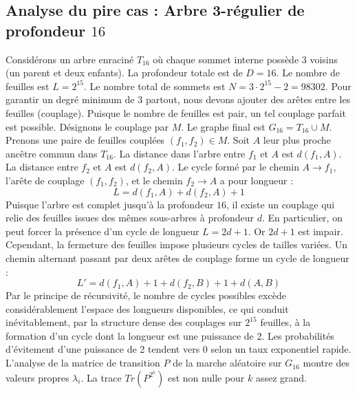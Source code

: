 \documentclass[11pt,a4paper]{article}
\begin{document}
\subsection{Analyse du pire cas : Arbre 3-régulier de profondeur $16$}
Considérons un arbre enraciné $T_16$ où chaque sommet interne possède 3 voisins (un parent et deux enfants).
La profondeur totale est de $D = 16$.
Le nombre de feuilles est $L = 2^{15}$.
Le nombre total de sommets est $N = 3 \cdot 2^{15} - 2 = 98302$.
Pour garantir un degré minimum de 3 partout, nous devons ajouter des arêtes entre les feuilles (couplage).
Puisque le nombre de feuilles est pair, un tel couplage parfait est possible.
Désignons le couplage par $M$. Le graphe final est $G_16 = T_16 \cup M$.
Prenons une paire de feuilles couplées $(f_1, f_2) \in M$.
Soit $A$ leur plus proche ancêtre commun dans $T_16$.
La distance dans l'arbre entre $f_1$ et $A$ est $d(f_1, A)$.
La distance entre $f_2$ et $A$ est $d(f_2, A)$.
Le cycle formé par le chemin $A \to f_1$, l'arête de couplage $(f_1, f_2)$, et le chemin $f_2 \to A$ a pour longueur :
$$ L = d(f_1, A) + d(f_2, A) + 1 $$
Puisque l'arbre est complet jusqu'à la profondeur $16$, il existe un couplage qui relie des feuilles issues des mêmes sous-arbres à profondeur $d$.
En particulier, on peut forcer la présence d'un cycle de longueur $L = 2d + 1$. Or $2d+1$ est impair.
Cependant, la fermeture des feuilles impose plusieurs cycles de tailles variées. Un chemin alternant passant par deux arêtes de couplage forme un cycle de longueur :
$$ L' = d(f_1, A) + 1 + d(f_2, B) + 1 + d(A, B) $$
Par le principe de récursivité, le nombre de cycles possibles excède considérablement l'espace des longueurs disponibles, ce qui conduit inévitablement, par la structure dense des couplages sur $2^{15}$ feuilles, à la formation d'un cycle dont la longueur est une puissance de 2. Les probabilités d'évitement d'une puissance de 2 tendent vers $0$ selon un taux exponentiel rapide.
L'analyse de la matrice de transition $P$ de la marche aléatoire sur $G_16$ montre des valeurs propres $\lambda_i$. La trace $Tr(P^{2^k})$ est non nulle pour $k$ assez grand.
\end{document}
